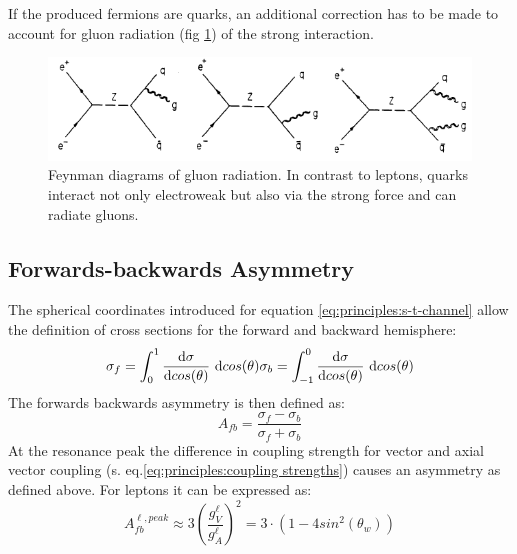 If the produced fermions are quarks,  an additional correction has to be made to account for gluon radiation (fig \ref{fig:principles:QCDkorrektur}) of the strong interaction.
\begin{figure}[H]
\centering
\includegraphics[width=1.0\linewidth]{graphics/QCDkorrektur}
\caption[Feynman daigrams: gluon radiation]{Feynman diagrams of gluon radiation. In contrast to leptons, quarks interact not only electroweak but also via the strong force and can radiate gluons.\cite{muenchen}}
\label{fig:principles:QCDkorrektur}
\end{figure}
\subsection{Forwards-backwards Asymmetry}
The spherical coordinates introduced for equation \ref{eq:principles:s-t-channel} allow the definition of cross sections for the forward and backward hemisphere:
\begin{equation}
\sigma_f=\int_{0}^{1}\frac{\text{d}\sigma}{\text{d}cos(\theta)}~\text{d}cos(\theta) \\
\sigma_b=\int_{-1}^{0}\frac{\text{d}\sigma}{\text{d}cos(\theta)}~\text{d}cos(\theta)
\label{eq:principles:fbintegral}
\end{equation}
The forwards backwards asymmetry is then defined as:
\begin{equation}
A_{fb}=\frac{\sigma_f-\sigma_b}{\sigma_f+\sigma_b}
\label{eq:principles:asymmetry definition}
\end{equation}
At the resonance peak the difference in coupling strength for vector and axial vector coupling (s. eq.\ref{eq:principles:coupling strengths}) causes an asymmetry as defined above. For leptons it can be expressed as:
\begin{equation}
A_{fb}^{\ell,peak}\approx 3 \left ( \frac{g^{\ell}_V}{g^{\ell}_A} \right )^2=3\cdot (1-4 sin^2(\theta_w))
\label{eq:principles:asymmetry weinberg angle}
\end{equation}